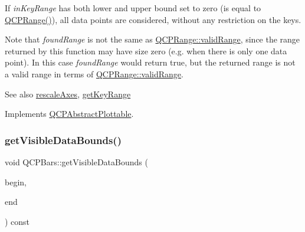 If {\itshape in\+Key\+Range} has both lower and upper bound set to zero (is equal to {\ttfamily \hyperlink{class_q_c_p_range}{Q\+C\+P\+Range()}}), all data points are considered, without any restriction on the keys.

Note that {\itshape found\+Range} is not the same as \hyperlink{class_q_c_p_range_ab38bd4841c77c7bb86c9eea0f142dcc0}{Q\+C\+P\+Range\+::valid\+Range}, since the range returned by this function may have size zero (e.\+g. when there is only one data point). In this case {\itshape found\+Range} would return true, but the returned range is not a valid range in terms of \hyperlink{class_q_c_p_range_ab38bd4841c77c7bb86c9eea0f142dcc0}{Q\+C\+P\+Range\+::valid\+Range}.

\begin{DoxySeeAlso}{See also}
\hyperlink{class_q_c_p_abstract_plottable_a1491c4a606bccd2d09e65e11b79eb882}{rescale\+Axes}, \hyperlink{class_q_c_p_bars_ac5a3854774d9d9cd129b1eae1426de2d}{get\+Key\+Range} 
\end{DoxySeeAlso}


Implements \hyperlink{class_q_c_p_abstract_plottable_a4de773988b21ed090fddd27c6a3a3dcb}{Q\+C\+P\+Abstract\+Plottable}.

\mbox{\label{class_q_c_p_bars_ac8b6b514a665a7bff4fb080413ba996a}} 
\subsubsection{\texorpdfstring{get\+Visible\+Data\+Bounds()}{getVisibleDataBounds()}}
{\footnotesize\ttfamily void Q\+C\+P\+Bars\+::get\+Visible\+Data\+Bounds (\begin{DoxyParamCaption}\item[{\hyperlink{class_q_c_p_data_container_ae40a91f5cb0bcac61d727427449b7d15}{Q\+C\+P\+Bars\+Data\+Container\+::const\+\_\+iterator} \&}]{begin,  }\item[{\hyperlink{class_q_c_p_data_container_ae40a91f5cb0bcac61d727427449b7d15}{Q\+C\+P\+Bars\+Data\+Container\+::const\+\_\+iterator} \&}]{end }\end{DoxyParamCaption}) const\hspace{0.3cm}{\ttfamily [protected]}}

\mbox{\label{class_q_c_p_bars_ac22e00a6a41509538c21b04f0a57318c}} 

